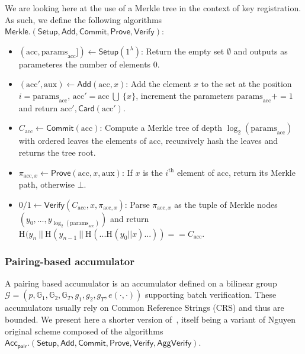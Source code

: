 \documentclass{article}
\newcommand{\isequal}{\ensuremath{==}\xspace}
\newcommand{\G}[1]{\ensuremath{\mathbb{G}_{#1}}\xspace}
\newcommand{\Hash}[1]{\ensuremath{\textrm{H}_{#1}}\xspace}
\newcommand{\e}[2]{\ensuremath{e(#1,\xspace #2)}\xspace}
\newcommand{\acc}{\ensuremath{\textrm{acc}}\xspace}
\newcommand{\aux}{\ensuremath{\textrm{aux}}\xspace}
\newcommand{\pp}{\ensuremath{\textrm{params}}\xspace}
\newcommand{\Acc}{\ensuremath{\mathsf{Acc}}\xspace}
\newcommand{\pair}{\ensuremath{\mathsf{pair}}\xspace}
\newcommand{\Merkle}{\ensuremath{\mathsf{Merkle}}\xspace}
\newcommand{\Verify}{\ensuremath{\mathsf{Verify}}\xspace}
\newcommand{\AggVerify}{\ensuremath{\mathsf{AggVerify}}\xspace}
\newcommand{\Setup}{\ensuremath{\mathsf{Setup}}\xspace}
\newcommand{\Add}{\ensuremath{\mathsf{Add}}\xspace}
\newcommand{\Prove}{\ensuremath{\mathsf{Prove}}\xspace}
\newcommand{\Commit}{\ensuremath{\mathsf{Commit}}\xspace}
\begin{document}
We are looking here at the use of a Merkle tree in the context of key registration. As such, we define the following algorithms $\Merkle.(\Setup, \Add, \Commit, \Prove, \Verify)$:
\begin{itemize}
    \item $(\acc, \pp_\acc]) \leftarrow \Setup(1^\lambda)$: Return the empty set $\emptyset$ and outputs as parameteres the number of elements 0.
    \item $(\acc', \aux) \leftarrow \Add(\acc, x)$: Add the element $x$ to the set at the position $i = \pp_\acc$,  $\acc' = \acc\ \bigcup\ \{x\}$,  increment the parameters $\pp_\acc +=1$ and return $\acc', \textsf{Card}(\acc')$.
    \item $C_\acc \leftarrow \Commit(\acc)$: Compute a Merkle tree of depth $\log_2(\pp_\acc)$ with ordered leaves the elements of \acc, recursively hash the leaves and returns the tree root.
    \item $\pi_{\acc, x} \leftarrow \Prove(\acc, x, \aux)$: If $x$ is the $i^{\mathrm{th}}$ element of \acc, return its Merkle path, otherwise $\bot$.
    \item $0/1 \leftarrow \Verify(C_\acc, x, \pi_{\acc, x})$: Parse $\pi_{\acc, x}$ as the tuple of Merkle nodes $(y_0, \dots, y_{\log_2(\pp_\acc)})$ and return $\Hash{}(y_n \ ||\ \Hash{}(y_{n-1}\ ||\ \Hash{}(... \Hash{}( y_0 ||x)...)) \isequal C_\acc$.
\end{itemize}

%
\subsubsection{Pairing-based accumulator}
A pairing based accumulator is an accumulator defined on a bilinear group $\mathcal{G} = (p,\G{1}, \G{2}, \G{T}, g_1, g_2, g_T, \e{\cdot}{\cdot})$ supporting batch verification. These accumulators usually rely on Common Reference Strings (CRS) and thus are bounded.
We present here a shorter version of~\cite{srinivasan2022batching}, itself being a variant of Nguyen~\cite{nguyen2005accumulators} original scheme composed of the algorithms $\Acc_\pair.(\Setup, \Add, \Commit, \Prove, \Verify, \AggVerify)$.
\end{document}
